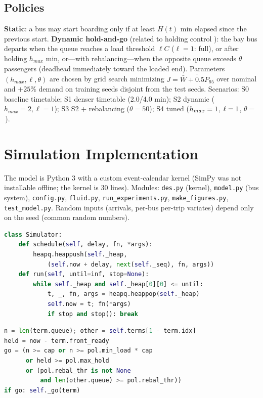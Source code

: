 \documentclass[10pt,twocolumn,letterpaper]{article}
\begin{document}
\subsection{Policies}
\textbf{Static}: a bus may start boarding only if at least $H(t)$ min elapsed since the previous start. \textbf{Dynamic hold-and-go}
(related to holding control \cite{osuna}): the bay bus departs when the queue reaches a load threshold $\ell C$ ($\ell=1$: full), or after holding $h_{max}$ min,
or---with rebalancing---when the opposite queue exceeds $\theta$ passengers (deadhead immediately toward the loaded end).
Parameters $(h_{max},\ell,\theta)$ are chosen by grid search minimizing $J=\overline{\bar W+0.5P_{95}}$ over nominal and $+25\%$ demand on training seeds disjoint from the
test seeds. Scenarios: S0 baseline timetable; S1 denser timetable (2.0/4.0 min); S2 dynamic ($h_{max}=2,\ell=1$); S3 S2 + rebalancing ($\theta=50$);
S4 tuned ($h_{max}=1$, $\ell=1$, $\theta=$\,\fourReb).

\section{Simulation Implementation}
The model is Python 3 with a custom event-calendar kernel (SimPy was not installable offline; the kernel is 30 lines).
Modules: \texttt{des.py} (kernel), \texttt{model.py} (bus system), \texttt{config.py}, \texttt{fluid.py},
\texttt{run\_experiments.py}, \texttt{make\_figures.py}, \texttt{test\_model.py}. Random inputs (arrivals, per-bus per-trip variates) depend only on the seed (common
random numbers).

\begin{lstlisting}[language=Python,caption={Event kernel (des.py).}]
class Simulator:
    def schedule(self, delay, fn, *args):
        heapq.heappush(self._heap,
            (self.now + delay, next(self._seq), fn, args))
    def run(self, until=inf, stop=None):
        while self._heap and self._heap[0][0] <= until:
            t, _, fn, args = heapq.heappop(self._heap)
            self.now = t; fn(*args)
            if stop and stop(): break
\end{lstlisting}

\begin{lstlisting}[language=Python,caption={Dynamic dispatch decision (model.py).}]
n = len(term.queue); other = self.terms[1 - term.idx]
held = now - term.front_ready
go = (n >= cap or n >= pol.min_load * cap
      or held >= pol.max_hold
      or (pol.rebal_thr is not None
          and len(other.queue) >= pol.rebal_thr))
if go: self._go(term)
\end{lstlisting}
\end{document}
